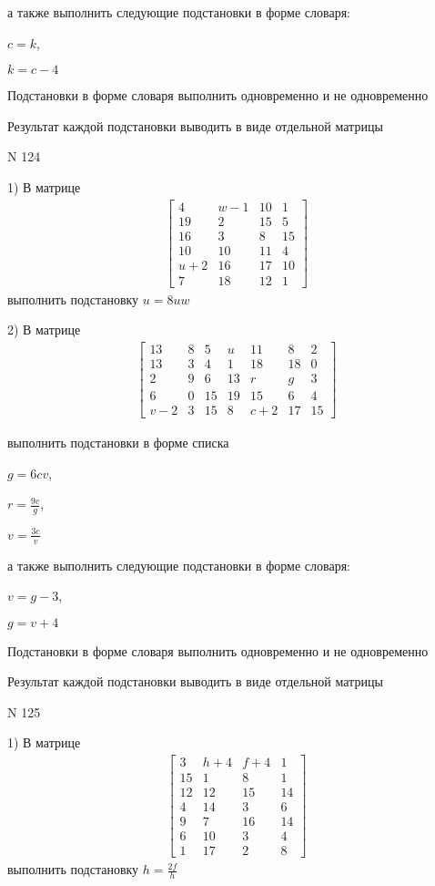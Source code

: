 \documentclass[11pt]{report}
\begin{document}
а также выполнить следующие подстановки в форме словаря:

$c=k$,

$k=c - 4$


    Подстановки в форме словаря выполнить одновременно и не одновременно


    Результат каждой подстановки выводить в виде отдельной матрицы

\newpage
N 124


    1) В матрице
\begin{align*}
\left[\begin{matrix}4 & w - 1 & 10 & 1\\19 & 2 & 15 & 5\\16 & 3 & 8 & 15\\10 & 10 & 11 & 4\\u + 2 & 16 & 17 & 10\\7 & 18 & 12 & 1\end{matrix}\right]
\end{align*}
выполнить подстановку $u=8 u w$


    2) В матрице
\begin{align*}
\left[\begin{matrix}13 & 8 & 5 & u & 11 & 8 & 2\\13 & 3 & 4 & 1 & 18 & 18 & 0\\2 & 9 & 6 & 13 & r & g & 3\\6 & 0 & 15 & 19 & 15 & 6 & 4\\v - 2 & 3 & 15 & 8 & c + 2 & 17 & 15\end{matrix}\right]
\end{align*}

выполнить подстановки в форме списка

$g=6 c v$,

$r=\frac{9 c}{g}$,

$v=\frac{3 c}{v}$

а также выполнить следующие подстановки в форме словаря:

$v=g - 3$,

$g=v + 4$


    Подстановки в форме словаря выполнить одновременно и не одновременно


    Результат каждой подстановки выводить в виде отдельной матрицы

\newpage
N 125


    1) В матрице
\begin{align*}
\left[\begin{matrix}3 & h + 4 & f + 4 & 1\\15 & 1 & 8 & 1\\12 & 12 & 15 & 14\\4 & 14 & 3 & 6\\9 & 7 & 16 & 14\\6 & 10 & 3 & 4\\1 & 17 & 2 & 8\end{matrix}\right]
\end{align*}
выполнить подстановку $h=\frac{2 f}{h}$
\end{document}
